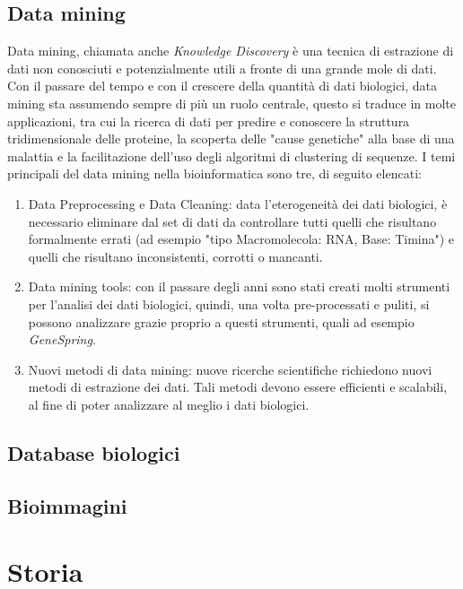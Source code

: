 \subsection{Data mining}
Data mining, chiamata anche \textit{Knowledge Discovery} è una tecnica di estrazione di dati non conosciuti e potenzialmente utili a fronte di una grande mole di dati. Con il passare del tempo e con il crescere della quantità di dati biologici, data mining sta assumendo sempre di più un ruolo centrale, questo si traduce in molte applicazioni, tra cui la ricerca di dati per predire e conoscere la struttura tridimensionale delle proteine, la scoperta delle "cause genetiche" alla base di una malattia e la facilitazione dell'uso degli algoritmi di clustering di sequenze.
\newline
I temi principali del data mining nella bioinformatica sono tre, di seguito elencati:
\begin{enumerate}
	\item Data Preprocessing e Data Cleaning: data l'eterogeneità dei dati biologici, è necessario eliminare dal set di dati da controllare tutti quelli che risultano formalmente errati (ad esempio "tipo Macromolecola: RNA, Base: Timina") e quelli che risultano inconsistenti, corrotti o mancanti.
	\item Data mining tools: con il passare degli anni sono stati creati molti strumenti per l'analisi dei dati biologici, quindi, una volta pre-processati e puliti, si possono analizzare grazie proprio a questi strumenti, quali ad esempio \textit{GeneSpring}.
	\item Nuovi metodi di data mining: nuove ricerche scientifiche richiedono nuovi metodi di estrazione dei dati. Tali metodi devono essere efficienti e scalabili, al fine di poter analizzare al meglio i dati biologici.
\end{enumerate}

\subsection{Database biologici} %
\subsection{Bioimmagini}



\section{Storia}
